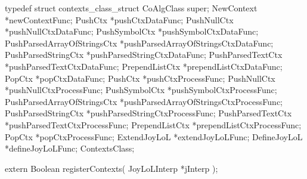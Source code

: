 \startTestSuite[registerContexts]

\startCHeader
typedef struct contexts_class_struct {
  CoAlgClass      super;
  NewContext     *newContextFunc;
  PushCtx        *pushCtxDataFunc; 
  PushNullCtx    *pushNullCtxDataFunc;
  PushSymbolCtx  *pushSymbolCtxDataFunc;
  PushParsedArrayOfStringsCtx 
    *pushParsedArrayOfStringsCtxDataFunc;
  PushParsedStringCtx
    *pushParsedStringCtxDataFunc;
  PushParsedTextCtx
    *pushParsedTextCtxDataFunc;
  PrependListCtx *prependListCtxDataFunc;
  PopCtx         *popCtxDataFunc;
  PushCtx        *pushCtxProcessFunc;
  PushNullCtx    *pushNullCtxProcessFunc;
  PushSymbolCtx  *pushSymbolCtxProcessFunc;
  PushParsedArrayOfStringsCtx
    *pushParsedArrayOfStringsCtxProcessFunc;
  PushParsedStringCtx
    *pushParsedStringCtxProcessFunc;
  PushParsedTextCtx
    *pushParsedTextCtxProcessFunc;
  PrependListCtx *prependListCtxProcessFunc;
  PopCtx         *popCtxProcessFunc;
  ExtendJoyLoL   *extendJoyLoLFunc;
  DefineJoyLoL   *defineJoyLoLFunc;
} ContextsClass;
\stopCHeader

\startCHeader
extern Boolean registerContexts(
  JoyLoLInterp *jInterp
);
\stopCHeader
{}

